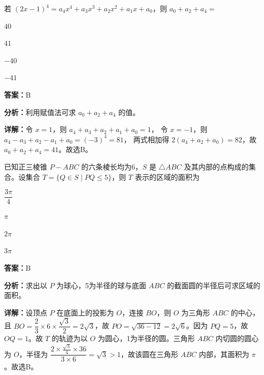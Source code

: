 \begin{question}[points=4]
若 $(2x-1)^4 = a_4 x^4 + a_3 x^3 + a_2 x^2 + a_1 x + a_0$，则 $a_0 + a_2 + a_4 =$
\begin{choices}
  \item $40$
  \item $41$
  \item $-40$
  \item $-41$
\end{choices}
\begin{solution}
\textbf{答案：}B

\textbf{分析：}利用赋值法可求 $a_0 + a_2 + a_4$ 的值。

\textbf{详解：}令 $x = 1$，则 $a_4 + a_3 + a_2 + a_1 + a_0 = 1$，
令 $x = -1$，则 $a_4 - a_3 + a_2 - a_1 + a_0 = (-3)^4 = 81$，
两式相加得 $2(a_4 + a_2 + a_0) = 82$，故 $a_0 + a_2 + a_4 = 41$。故选B。
\end{solution}
\end{question}

\begin{question}[points=4]
已知正三棱锥 $P-ABC$ 的六条棱长均为6，$S$ 是 $\triangle ABC$ 及其内部的点构成的集合。设集合 $T = \{ Q \in S \mid PQ \leq 5 \}$，则 $T$ 表示的区域的面积为
\begin{choices}
  \item $\dfrac{3\pi}{4}$
  \item $\pi$
  \item $2\pi$
  \item $3\pi$
\end{choices}
\begin{solution}
\textbf{答案：}B

\textbf{分析：}求出以 $P$ 为球心，5为半径的球与底面 $ABC$ 的截面圆的半径后可求区域的面积。

\textbf{详解：}设顶点 $P$ 在底面上的投影为 $O$，连接 $BO$，则 $O$ 为三角形 $ABC$ 的中心，且 $BO = \dfrac{2}{3} \times 6 \times \dfrac{\sqrt{3}}{2} = 2\sqrt{3}$，故 $PO = \sqrt{36 - 12} = 2\sqrt{6}$。因为 $PQ = 5$，故 $OQ = 1$。故 $T$ 的轨迹为以 $O$ 为圆心，1为半径的圆。三角形 $ABC$ 内切圆的圆心为 $O$，半径为 $\dfrac{2 \times \frac{\sqrt{3}}{4} \times 36}{3 \times 6} = \sqrt{3} > 1$，故该圆在三角形 $ABC$ 内部，其面积为 $\pi$。故选B。
\end{solution}
\end{question}

